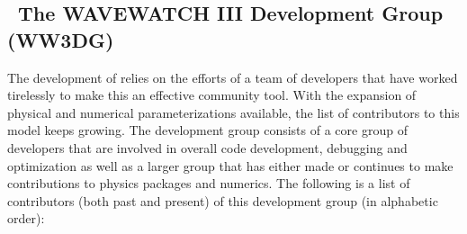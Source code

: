 \vssub
\subsection{~The WAVEWATCH III\textsuperscript{\textregistered} Development Group (WW3DG) \label{sec:WW3DG}}
\vssub

The development of \ww  relies on the efforts of a team of developers that have worked tirelessly to make this an effective community tool. With the expansion of physical and numerical parameterizations available, the list of contributors to this model keeps growing. The development group consists of a core group of developers that are involved in overall code development, debugging and optimization as well as a larger group that has either made or continues to make contributions to physics packages and numerics. The following is a list of contributors (both past and present) of this development group (in alphabetic order):

